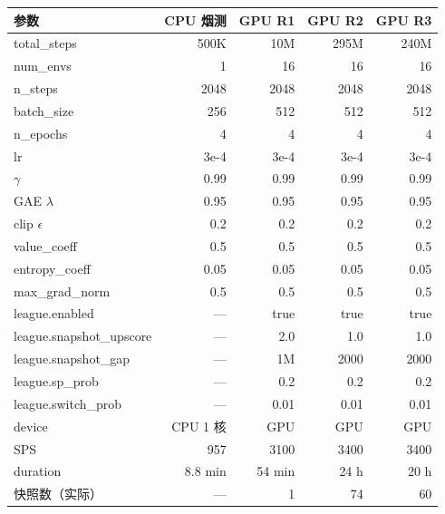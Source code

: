 \documentclass[twocolumn,a4paper,10pt]{ctexart}
\begin{document}
\begin{tabularx}{\textwidth}{@{}l r r r r@{}}
\toprule
参数 & CPU 烟测 & GPU R1 & GPU R2 & GPU R3 \\
\midrule
total\_steps          & 500K     & 10M       & 295M       & 240M       \\
num\_envs             & 1        & 16        & 16         & 16         \\
n\_steps              & 2048     & 2048      & 2048       & 2048       \\
batch\_size           & 256      & 512       & 512        & 512        \\
n\_epochs             & 4        & 4         & 4          & 4          \\
lr                    & 3e-4     & 3e-4      & 3e-4       & 3e-4       \\
$\gamma$              & 0.99     & 0.99      & 0.99       & 0.99       \\
GAE $\lambda$         & 0.95     & 0.95      & 0.95       & 0.95       \\
clip $\epsilon$       & 0.2      & 0.2       & 0.2        & 0.2        \\
value\_coeff          & 0.5      & 0.5       & 0.5        & 0.5        \\
entropy\_coeff        & 0.05     & 0.05      & 0.05       & 0.05       \\
max\_grad\_norm       & 0.5      & 0.5       & 0.5        & 0.5        \\
\midrule
league.enabled        & ---      & true      & true       & true       \\
league.snapshot\_upscore & ---   & 2.0       & 1.0        & 1.0        \\
league.snapshot\_gap  & ---      & 1M        & 2000       & 2000       \\
league.sp\_prob       & ---      & 0.2       & 0.2        & 0.2        \\
league.switch\_prob   & ---      & 0.01      & 0.01       & 0.01       \\
\midrule
device                & CPU 1 核 & GPU       & GPU        & GPU        \\
SPS                   & 957      & 3100      & 3400       & 3400       \\
duration              & 8.8 min  & 54 min    & 24 h       & 20 h       \\
快照数（实际）        & ---      & 1         & 74         & 60         \\
\bottomrule
\end{tabularx}
\end{document}
